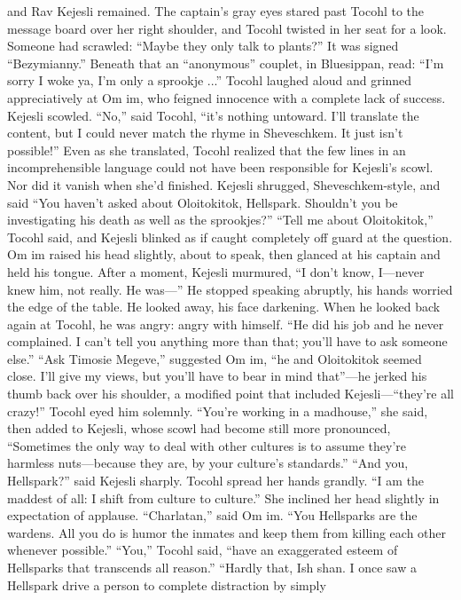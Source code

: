 \documentclass[9pt]{article}
\begin{document}
and Rav Kejesli remained. The captain’s gray eyes stared past Tocohl to the message board over her
right shoulder, and Tocohl twisted in her seat for a look. Someone had scrawled: “Maybe they only talk
to plants?” It was signed “Bezymianny.” Beneath that an “anonymous” couplet, in Bluesippan, read:
“I’m sorry I woke ya,
I’m only a sprookje ...”
Tocohl laughed aloud and grinned appreciatively at Om im, who feigned innocence with a complete
lack of success. Kejesli scowled.
“No,” said Tocohl, “it’s nothing untoward. I’ll translate the content, but I could never match the
rhyme in Sheveschkem. It just isn’t possible!”
Even as she translated, Tocohl realized that the few lines in an incomprehensible language could not
have been responsible for Kejesli’s scowl. Nor did it vanish when she’d finished.
Kejesli shrugged, Sheveschkem-style, and said “You haven’t asked about Oloitokitok, Hellspark.
Shouldn’t you be investigating his death as well as the sprookjes?”
“Tell me about Oloitokitok,” Tocohl said, and Kejesli blinked as if caught completely off guard at the
question. Om im raised his head slightly, about to speak, then glanced at his captain and held his tongue.
After a moment, Kejesli murmured, “I don’t know, I—never knew him, not really. He was—” He
stopped speaking abruptly, his hands worried the edge of the table. He looked away, his face darkening.
When he looked back again at Tocohl, he was angry: angry with himself. “He did his job and he
never complained. I can’t tell you anything more than that; you’ll have to ask someone else.”
“Ask Timosie Megeve,” suggested Om im, “he and Oloitokitok seemed close. I’ll give my views, but
you’ll have to bear in mind that”—he jerked his thumb back over his shoulder, a modified point that
included Kejesli—“they’re all crazy!”
Tocohl eyed him solemnly. “You’re working in a madhouse,” she said, then added to Kejesli, whose
scowl had become still more pronounced, “Sometimes the only way to deal with other cultures is to
assume they’re harmless nuts—because they are, by your culture’s standards.”
“And you, Hellspark?” said Kejesli sharply.
Tocohl spread her hands grandly. “I am the maddest of all: I shift from culture to culture.” She
inclined her head slightly in expectation of applause.
“Charlatan,” said Om im. “You Hellsparks are the wardens. All you do is humor the inmates and
keep them from killing each other whenever possible.”
“You,” Tocohl said, “have an exaggerated esteem of Hellsparks that transcends all reason.”
“Hardly that, Ish shan. I once saw a Hellspark drive a person to complete distraction by simply
\end{document}
